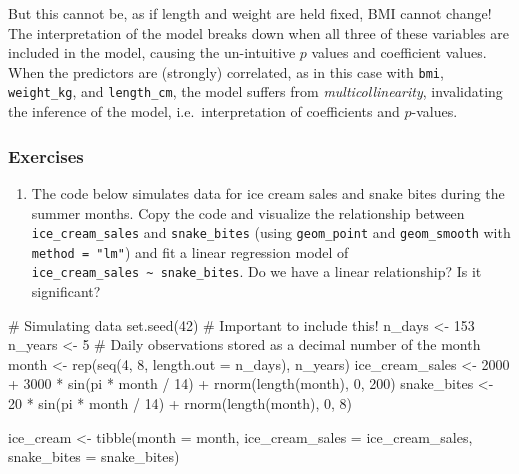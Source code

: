\documentclass[
  letterpaper,
  DIV=11,
  numbers=noendperiod]{scrreprt}
\newenvironment{Shaded}{\begin{snugshade}}{\end{snugshade}}
\newcommand{\AttributeTok}[1]{\textcolor[rgb]{0.40,0.45,0.13}{#1}}
\newcommand{\CommentTok}[1]{\textcolor[rgb]{0.37,0.37,0.37}{#1}}
\newcommand{\DecValTok}[1]{\textcolor[rgb]{0.68,0.00,0.00}{#1}}
\newcommand{\FunctionTok}[1]{\textcolor[rgb]{0.28,0.35,0.67}{#1}}
\newcommand{\NormalTok}[1]{\textcolor[rgb]{0.00,0.23,0.31}{#1}}
\newcommand{\OtherTok}[1]{\textcolor[rgb]{0.00,0.23,0.31}{#1}}
\newcommand{\SpecialCharTok}[1]{\textcolor[rgb]{0.37,0.37,0.37}{#1}}
\providecommand{\tightlist}{%
  \setlength{\itemsep}{0pt}\setlength{\parskip}{0pt}}\usepackage{longtable,booktabs,array}
\begin{document}
But this cannot be, as if length and weight are held fixed, BMI cannot
change! The interpretation of the model breaks down when all three of
these variables are included in the model, causing the un-intuitive
\(p\) values and coefficient values. When the predictors are (strongly)
correlated, as in this case with \texttt{bmi}, \texttt{weight\_kg}, and
\texttt{length\_cm}, the model suffers from \emph{multicollinearity},
invalidating the inference of the model, i.e.~interpretation of
coefficients and \(p\)-values.

\subsubsection{Exercises}\label{exercises-18}

\begin{enumerate}
\def\labelenumi{\arabic{enumi}.}
\tightlist
\item
  The code below simulates data for ice cream sales and snake bites
  during the summer months. Copy the code and visualize the relationship
  between \texttt{ice\_cream\_sales} and \texttt{snake\_bites} (using
  \texttt{geom\_point} and \texttt{geom\_smooth} with
  \texttt{method\ =\ "lm"}) and fit a linear regression model of
  \texttt{ice\_cream\_sales\ \textasciitilde{}\ snake\_bites}. Do we
  have a linear relationship? Is it significant?
\end{enumerate}

\begin{Shaded}
\begin{Highlighting}[]
\CommentTok{\# Simulating data}
\FunctionTok{set.seed}\NormalTok{(}\DecValTok{42}\NormalTok{) }\CommentTok{\# Important to include this!}
\NormalTok{n\_days }\OtherTok{\textless{}{-}} \DecValTok{153} 
\NormalTok{n\_years }\OtherTok{\textless{}{-}} \DecValTok{5}
\CommentTok{\# Daily observations stored as a decimal number of the month}
\NormalTok{month }\OtherTok{\textless{}{-}} \FunctionTok{rep}\NormalTok{(}\FunctionTok{seq}\NormalTok{(}\DecValTok{4}\NormalTok{, }\DecValTok{8}\NormalTok{, }\AttributeTok{length.out =}\NormalTok{ n\_days), n\_years) }
\NormalTok{ice\_cream\_sales }\OtherTok{\textless{}{-}} \DecValTok{2000} \SpecialCharTok{+} \DecValTok{3000} \SpecialCharTok{*} \FunctionTok{sin}\NormalTok{(pi }\SpecialCharTok{*}\NormalTok{ month }\SpecialCharTok{/} \DecValTok{14}\NormalTok{) }\SpecialCharTok{+} \FunctionTok{rnorm}\NormalTok{(}\FunctionTok{length}\NormalTok{(month), }\DecValTok{0}\NormalTok{, }\DecValTok{200}\NormalTok{)}
\NormalTok{snake\_bites }\OtherTok{\textless{}{-}} \DecValTok{20} \SpecialCharTok{*} \FunctionTok{sin}\NormalTok{(pi }\SpecialCharTok{*}\NormalTok{ month }\SpecialCharTok{/} \DecValTok{14}\NormalTok{) }\SpecialCharTok{+} \FunctionTok{rnorm}\NormalTok{(}\FunctionTok{length}\NormalTok{(month), }\DecValTok{0}\NormalTok{, }\DecValTok{8}\NormalTok{)}

\NormalTok{ice\_cream }\OtherTok{\textless{}{-}} \FunctionTok{tibble}\NormalTok{(}\AttributeTok{month =}\NormalTok{ month, }\AttributeTok{ice\_cream\_sales =}\NormalTok{ ice\_cream\_sales, }\AttributeTok{snake\_bites =}\NormalTok{ snake\_bites)}
\end{Highlighting}
\end{Shaded}
\end{document}
